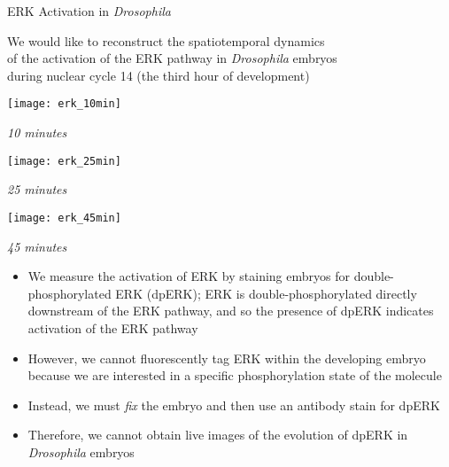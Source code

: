 \begin{frame}{ERK Activation in {\em Drosophila}}
	
	\centering
	We would like to reconstruct the spatiotemporal dynamics \\
	of the activation of the ERK pathway in {\em Drosophila} embryos\\
	during nuclear cycle 14 (the third hour of development)

    \centering
	\begin{minipage}{0.3\textwidth}
	    \texttt{[image: erk\_10min]}\\
	    {\scriptsize \em 10 minutes \par}
	\end{minipage}
	\begin{minipage}{0.3\textwidth}
	    \texttt{[image: erk\_25min]}\\
	    {\scriptsize \em 25 minutes \par}
	\end{minipage}
	\begin{minipage}{0.3\textwidth}
	    \texttt{[image: erk\_45min]}\\
	    {\scriptsize \em 45 minutes \par}
	\end{minipage}
	
	\begin{itemize}
		\item We measure the activation of ERK by staining embryos for double-phosphorylated ERK (dpERK); ERK is double-phosphorylated  directly downstream of the ERK pathway, and so the presence of dpERK indicates activation of the ERK pathway
	
		\item However, we cannot fluorescently tag ERK within the developing embryo because we are interested in a specific phosphorylation state of the molecule
		
		\item Instead, we must {\em fix} the embryo and then use an antibody stain for dpERK
	
		\item Therefore, we cannot obtain live images of the evolution of dpERK in {\em Drosophila} embryos
	\end{itemize}
	
\end{frame}

